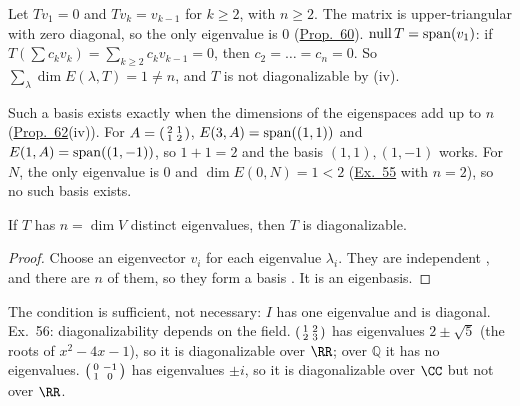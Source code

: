 \documentclass[10pt]{scrartcl}
\begin{document}
\begin{example*}\hypertarget{ex-55}{}\label{ex-55}
  Let $Tv_1=0$ and $Tv_k=v_{k-1}$ for $k\ge2$, with $n\ge2$. The matrix is upper-triangular with zero diagonal, so the only eigenvalue is $0$ (\hyperref[prop-60]{Prop.~60}). $\operatorname{null} T=\operatorname{span}(v_1)$: if $T(\sum c_kv_k)=\sum_{k\ge2}c_kv_{k-1}=0$, then $c_2=\dots=c_n=0$. So $\sum_\lambda\dim E(\lambda,T)=1\ne n$, and $T$ is not diagonalizable by (iv).
\end{example*}

\revisit Such a basis exists exactly when the dimensions of the eigenspaces add up to $n$ (\hyperref[prop-62]{Prop.~62}(iv)). For $A=\begin{psmallmatrix}2&1\\1&2\end{psmallmatrix}$, $E(3,A)=\operatorname{span}((1,1))$ and $E(1,A)=\operatorname{span}((1,-1))$, so $1+1=2$ and the basis $(1,1),(1,-1)$ works. For $N$, the only eigenvalue is $0$ and $\dim E(0,N)=1<2$ (\hyperref[ex-55]{Ex.~55} with $n=2$), so no such basis exists.

\begin{proposition*}\hypertarget{prop-63}{}\label{prop-63}
  If $T$ has $n=\dim V$ distinct eigenvalues, then $T$ is diagonalizable.
\end{proposition*}
\begin{proof}
  Choose an eigenvector $v_i$ for each eigenvalue $\lambda_i$. They are independent , and there are $n$ of them, so they form a basis . It is an eigenbasis.
\end{proof}
\begin{itemize}
  \ii The condition is sufficient, not necessary: $I$ has one eigenvalue and is diagonal.
  \ii Ex.~56: diagonalizability depends on the field. $\begin{psmallmatrix}1&2\\2&3\end{psmallmatrix}$ has eigenvalues $2\pm\sqrt5$ (the roots of $x^2-4x-1$), so it is diagonalizable over $\RR$; over $\mathbb Q$ it has no eigenvalues. $\begin{psmallmatrix}0&-1\\1&0\end{psmallmatrix}$ has eigenvalues $\pm i$, so it is diagonalizable over $\CC$ but not over $\RR$.
\end{itemize}
\end{document}
